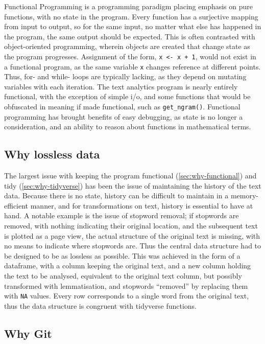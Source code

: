 \message{ !name(jason-cairns-dissertation.tex)}\documentclass[11pt, a4paper, titlepage]{report}
\begin{document}
Functional Programming is a programming paradigm placing emphasis on
pure functions, with no state in the program. Every function has a
surjective mapping from input to output, so for the same input, no
matter what else has happened in the program, the same output should
be expected. This is often contrasted with object-oriented
programming, wherein objects are created that change state as the
program progresses. Assignment of the form, \texttt{x <- x +
  1}, would not exist in a functional program, as the same variable
\texttt{x} changes reference at different points. Thus, for-
and while- loops are typically lacking, as they depend on mutating
variables with each iteration. The text analytics program is nearly
entirely functional, with the exception of simple i/o, and some
functions that would be obfuscated in meaning if made functional, such
as \texttt{get_ngram()}. Functional programming has brought
benefits of easy debugging, as state is no longer a consideration, and
an ability to reason about functions in mathematical terms.

\subsection{Why lossless data}

The largest issue with keeping the program functional
(\cref{sec:why-functional}) and tidy (\cref{sec:why-tidyverse}) has
been the issue of maintaining the history of the text data. Because
there is no state, history can be difficult to maintain in a
memory-efficient manner, and for transformations on text, history is
essential to have at hand. A notable example is the issue of stopword
removal; if stopwords are removed, with nothing indicating their
original location, and the subsequent text is plotted as a page view,
the actual structure of the original text is missing, with no means to
indicate where stopwords are. Thus the central data structure had to
be designed to be as lossless as possible. This was achieved in the
form of a dataframe, with a column keeping the original text, and a
new column holding the text to be analysed, equivalent to the original
text column, but possibly transformed with lemmatisation, and
stopwords ``removed'' by replacing them with \texttt{NA}
values. Every row corresponds to a single word from the original text,
thus the data structure is congruent with tidyverse functions.

\subsection{Why Git}
\end{document}
